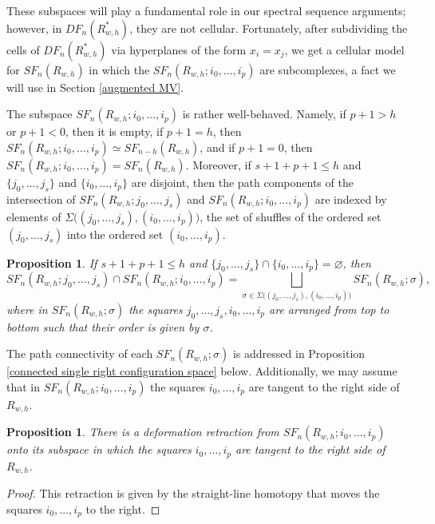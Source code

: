 \documentclass[pagebackref,colorlinks,citecolor=blue,linkcolor=blue,urlcolor=blue,filecolor=blue]{article}
\newtheorem{prop}[thm]{Proposition}
\theoremstyle{definition}\newtheorem{definition}[thm]{Definition}
\theoremstyle{definition}
\begin{document}
These subspaces will play a fundamental role in our spectral sequence arguments; however, in $DF_{n}(R^{*}_{w,h})$, they are not cellular.
Fortunately, after subdividing the cells of $DF_{n}(R^{*}_{w,h})$ via hyperplanes of the form $x_{i}=x_{j}$, we get a cellular model for $SF_{n}(R_{w,h})$ in which the $SF_{n}(R_{w,h};i_{0}, \dots, i_{p})$ are subcomplexes, a fact we will use in Section \ref{augmented MV}.

The subspace $SF_{n}(R_{w,h};i_{0}, \dots, i_{p})$ is rather well-behaved. 
Namely, if $p+1>h$ or $p+1<0$, then it is empty, if $p+1=h$, then $SF_{n}(R_{w,h};i_{0}, \dots, i_{p})\simeq SF_{n-h}(R_{w,h})$, and if $p+1=0$, then $SF_{n}(R_{w,h};i_{0}, \dots, i_{p})=SF_{n}(R_{w,h})$.
Moreover, if $s+1+p+1\le h$ and $\{j_{0}, \dots, j_{s}\}$ and $\{i_{0}, \dots, i_{p}\}$ are disjoint, then the path components of the intersection of $SF_{n}(R_{w,h};j_{0}, \dots, j_{s})$ and $SF_{n}(R_{w,h};i_{0}, \dots, i_{p})$ are indexed by elements of $\Sigma\big((j_{0}, \dots, j_{s}),(i_{0}, \dots, i_{p})\big)$, the set of shuffles of the ordered set $(j_{0}, \dots, j_{s})$ into the ordered set $(i_{0}, \dots, i_{p})$.

\begin{prop}\label{intersection is shuffle}
If $s+1+p+1\le h$ and $\{j_0,\ldots,j_s\}\cap\{i_0,\ldots,i_p\}=\varnothing$, then
\[
SF_{n}(R_{w,h};j_{0}, \dots, j_{s})\cap SF_{n}(R_{w,h};i_{0}, \dots, i_{p})=\bigsqcup_{\sigma\in \Sigma\big((j_{0}, \dots, j_{s}),(i_{0}, \dots, i_{p})\big)}SF_{n}(R_{w,h}; \sigma),
\]
where in $SF_{n}(R_{w,h}; \sigma)$ the squares $j_{0}, \dots, j_{s}, i_{0}, \dots, i_{p}$ are arranged from top to bottom such that their order is given by $\sigma$.
\end{prop}
The path connectivity of each $SF_n(R_{w,h};\sigma)$ is addressed in Proposition \ref{connected single right configuration space} below. Additionally, we may assume that in $SF_{n}(R_{w,h};i_{0}, \dots, i_{p})$ the squares $i_{0}, \dots, i_{p}$ are tangent to the right side of $R_{w,h}$.

\begin{prop}\label{move squares to right side}
There is a deformation retraction from $SF_{n}(R_{w,h};i_{0}, \dots, i_{p})$ onto its subspace in which the squares $i_{0}, \dots, i_{p}$ are tangent to the right side of $R_{w,h}$.
\end{prop}

\begin{proof}
This retraction is given by the straight-line homotopy that moves the squares $i_{0}, \dots, i_{p}$ to the right.
\end{proof}
\end{document}
